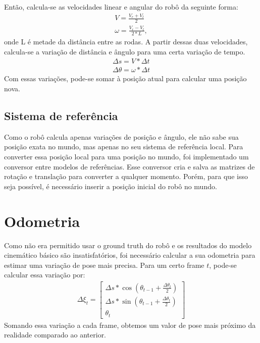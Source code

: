 \documentclass[twoside,conference,a4paper]{IEEEtran}
\begin{document}
Então, calcula-se as velocidades linear e angular do robô da seguinte forma:
\begin{gather*}
V = \frac{V_{r} + V_{l}}{2} \\
\omega = \frac{V_{r} - V_{l}}{2 * L},
\end{gather*}
onde L é metade da distância entre as rodas. A partir dessas duas velocidades, calcula-se a variação de distância e ângulo para uma certa variação de tempo. 
\begin{gather*}
\Delta s = V * \Delta t \\
\Delta \theta = \omega * \Delta t
\end{gather*}
Com essas variações, pode-se somar à posição atual para calcular uma posição nova.

\subsection{Sistema de referência}

Como o robô calcula apenas variações de posição e ângulo, ele não sabe sua posição exata no mundo, mas apenas no seu sistema de referência local. Para converter essa posição local para uma posição no mundo, foi implementado um conversor entre modelos de referências. Esse conversor cria e salva as matrizes de rotação e translação para converter a qualquer momento. Porém, para que isso seja possível, é necessário inserir a posição inicial do robô no mundo.

\section{Odometria}

Como não era permitido usar o ground truth do robô e os resultados do modelo cinemático básico são insatisfatórios, foi necessário calcular a sua odometria para estimar uma variação de pose mais precisa. Para um certo frame $t$, pode-se calcular essa variação por:
\begin{gather*}
\Delta \xi_{t} =
\begin{bmatrix}
\Delta s * \cos(\theta_{t-1} + \frac{\Delta \theta_{t}}{2}) \\
\Delta s * \sin(\theta_{t-1} + \frac{\Delta \theta_{t}}{2}) \\
\theta_{t}
\end{bmatrix}
\end{gather*}
Somando essa variação a cada frame, obtemos um valor de pose mais próximo da realidade comparado ao anterior.
\end{document}

